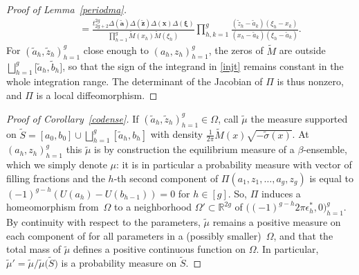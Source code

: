 \documentclass[pdftex]{sigma}
\numberwithin{equation}{section}
\begin{document}
\begin{proof}[Proof of Lemma~\ref{periodma}]
\begin{gather*}
\qquad{} = \frac{t_{2g + 2}^{2g} \Delta(\boldsymbol{\tilde{a}})\Delta(\boldsymbol{\tilde{z}}) \Delta(\boldsymbol{x}) \Delta(\boldsymbol{\xi})}{\prod_{h=1}^{g} \tilde{M}(x_{h}) \tilde{M}(\xi_{h})} \prod_{h,k = 1}^{g} \frac{(\tilde{z}_h - \tilde{a}_k)(\xi_h - x_k)}{(x_h - \tilde{a}_k)(\xi_h - \tilde{a}_k)}.
\end{gather*}
For $(\tilde{a}_h,\tilde{z}_h)_{h = 1}^{g}$ close enough to
$(a_h,z_h)_{h = 1}^{g}$, the zeros of $\tilde{M}$ are outside
$\bigsqcup_{h = 1}^{g} \bigl[\tilde{a}_{h},\tilde{b}_h\bigr]$, so that the
sign of the integrand in \eqref{injt} remains constant in the whole integration range. The determinant of the
Jacobian of $\Pi$ is thus nonzero, and $\Pi$ is a local
diffeomorphism.
\end{proof}

\begin{proof}[Proof of Corollary~\ref{codense}]
If $(\tilde{a}_h,\tilde{z}_h)_{h = 1}^{g} \in \Omega$, call $\tilde{\mu}$ the measure supported on $\tilde{S} = [a_0,b_0] \cup \bigsqcup_{h = 1}^{g} [\tilde{a}_h,b_h]$ with density $\frac{1}{2\pi} \tilde{M}(x)\sqrt{-\tilde{\sigma}(x)}$. At $(a_h,z_h)_{h = 1}^{g}$ this $\tilde{\mu}$ is by construction the equilibrium measure of a $\beta$-ensemble, which we simply denote $\mu$: it is in particular a probability measure with vector of filling fractions  and the $h$-th second component of $\Pi(a_1,z_1,\ldots,a_g,z_g)$ is equal to $(-1)^{g - h}(U(a_h) - U(b_{h - 1})) = 0$ for $h \in [g]$. So, $\Pi$ induces a homeomorphism from~$\Omega$ to a neighborhood $\Omega' \subset \mathbb{R}^{2g}$ of $\bigl((-1)^{g-h}2\pi \epsilon_h^* ,0\bigr)_{h = 1}^{g}$. By continuity with respect to the parameters, $\tilde{\mu}$ remains a positive measure on each component of  for all parameters in a (possibly smaller)~$\Omega$, and that the total mass of $\tilde{\mu}$ defines a positive continuous function on $\Omega$. In particular, $\tilde{\mu}' = \tilde{\mu}/\tilde{\mu}\big(\tilde{S}\big)$ is a probability measure on $\tilde{S}$.




\end{proof}
\end{document}
